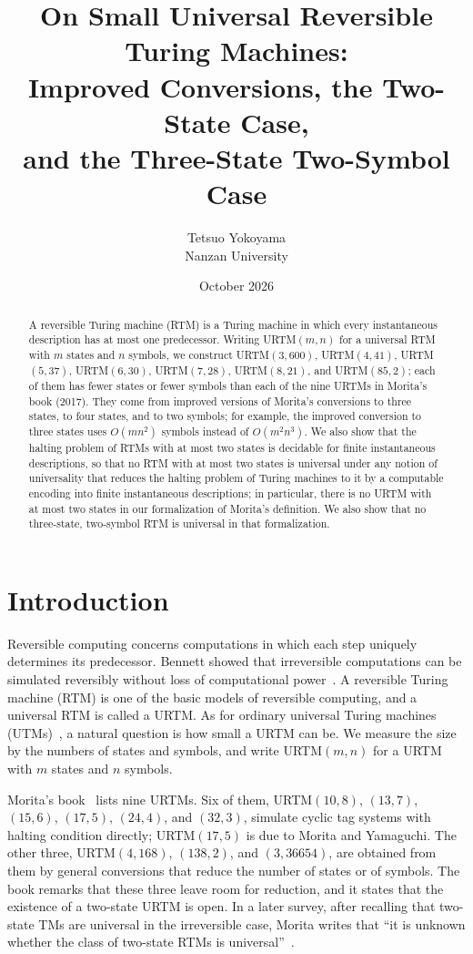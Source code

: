 \documentclass{article}
\title{On Small Universal Reversible Turing Machines:\\
 Improved Conversions, the Two-State Case,\\
 and the Three-State Two-Symbol Case}
\author{Tetsuo Yokoyama\\Nanzan University}
\date{October 2026}
\theoremstyle{definition}
\theoremstyle{remark}
\begin{document}
\maketitle

\begin{abstract}
A reversible Turing machine (RTM) is a Turing machine in which every instantaneous description has at most one predecessor.
Writing URTM$(m,n)$ for a universal RTM with $m$ states and $n$ symbols, we construct URTM$(3,600)$, URTM$(4,41)$, URTM$(5,37)$, URTM$(6,30)$, URTM$(7,28)$, URTM$(8,21)$, and URTM$(85,2)$; each of them has fewer states or fewer symbols than each of the nine URTMs in Morita's book (2017).
They come from improved versions of Morita's conversions to three states, to four states, and to two symbols; for example, the improved conversion to three states uses $O(mn^2)$ symbols instead of $O(m^2n^3)$.
We also show that the halting problem of RTMs with at most two states is decidable for finite instantaneous descriptions, so that no RTM with at most two states is universal under any notion of universality that reduces the halting problem of Turing machines to it by a computable encoding into finite instantaneous descriptions; in particular, there is no URTM with at most two states in our formalization of Morita's definition. We also show that no three-state, two-symbol RTM is universal in that formalization.
\end{abstract}

\section{Introduction}
\label{sec:intro}

Reversible computing concerns computations in which each step uniquely determines its predecessor.
Bennett showed that irreversible computations can be simulated reversibly without loss of computational power~\cite{Bennett73}.
A reversible Turing machine (RTM) is one of the basic models of reversible computing, and a universal RTM is called a URTM.
As for ordinary universal Turing machines (UTMs)~\cite{Rogozhin96,KudlekRogozhin02,NearyWoods09,WoodsNeary09}, a natural question is how small a URTM can be.
We measure the size by the numbers of states and symbols, and write URTM$(m,n)$ for a URTM with $m$ states and $n$ symbols.

Morita's book~\cite{Morita17} lists nine URTMs.
Six of them, URTM$(10,8)$, $(13,7)$, $(15,6)$, $(17,5)$, $(24,4)$, and $(32,3)$, simulate cyclic tag systems with halting condition directly; URTM$(17,5)$ is due to Morita and Yamaguchi.
The other three, URTM$(4,168)$, $(138,2)$, and $(3,36654)$, are obtained from them by general conversions that reduce the number of states or of symbols.
The book remarks that these three leave room for reduction, and it states that the existence of a two-state URTM is open.
In a later survey, after recalling that two-state TMs are universal in the irreversible case, Morita writes that ``it is unknown whether the class of two-state RTMs is universal''~\cite{Morita23}.
\end{document}
